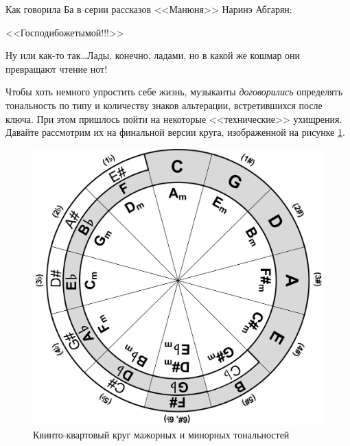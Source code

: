 Как говорила Ба в серии рассказов <<Манюня>> Наринэ Абгарян: 
\begin{center}
    <<Господибожетымой!!!>>
\end{center}

Ну или как-то так\ldots Лады, конечно, ладами, но в какой же кошмар они превращают чтение нот!

Чтобы хоть немного упростить себе жизнь, музыканты \emph{договорились} определять тональность по типу и количеству знаков альтерации, встретившихся после ключа. При этом пришлось пойти на некоторые <<технические>> ухищрения. Давайте рассмотрим их на финальной версии круга, изображенной на рисунке \ref{fig:harmony:kvinto-kvarto:kvinto-kvarto-final}.

\begin{figure}[!ht]
    \centering
    \includegraphics[scale=0.8]{fig/kvinto-kvarto/kvinto-kvarto-final} 
    \caption{Квинто-квартовый круг мажорных и минорных тональностей}\label{fig:harmony:kvinto-kvarto:kvinto-kvarto-final}
\end{figure}

